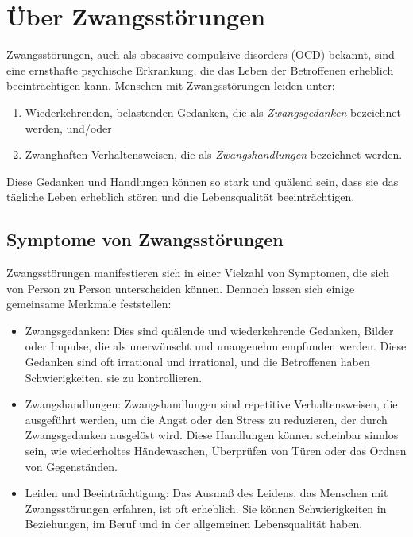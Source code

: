 \section{Über Zwangsstörungen}

Zwangsstörungen, auch als obsessive-compulsive disorders (OCD) bekannt, sind eine ernsthafte psychische Erkrankung, die das Leben der Betroffenen erheblich beeinträchtigen kann. Menschen mit Zwangsstörungen leiden unter:

\begin{enumerate}
  \item Wiederkehrenden, belastenden Gedanken, die als \textit{Zwangsgedanken} bezeichnet werden, und/oder
  \item Zwanghaften Verhaltensweisen, die als \textit{Zwangshandlungen} bezeichnet werden.
\end{enumerate}

Diese Gedanken und Handlungen können so stark und quälend sein, dass sie das tägliche Leben erheblich stören und die Lebensqualität beeinträchtigen.

\subsection{Symptome von Zwangsstörungen}

Zwangsstörungen manifestieren sich in einer Vielzahl von Symptomen, die sich von Person zu Person unterscheiden können. Dennoch lassen sich einige gemeinsame Merkmale feststellen:

\begin{itemize}
  \item Zwangsgedanken: Dies sind quälende und wiederkehrende Gedanken, Bilder oder Impulse, die als unerwünscht und unangenehm empfunden werden. Diese Gedanken sind oft irrational und irrational, und die Betroffenen haben Schwierigkeiten, sie zu kontrollieren.
  
  \item Zwangshandlungen: Zwangshandlungen sind repetitive Verhaltensweisen, die ausgeführt werden, um die Angst oder den Stress zu reduzieren, der durch Zwangsgedanken ausgelöst wird. Diese Handlungen können scheinbar sinnlos sein, wie wiederholtes Händewaschen, Überprüfen von Türen oder das Ordnen von Gegenständen.
  
  \item Leiden und Beeinträchtigung: Das Ausmaß des Leidens, das Menschen mit Zwangsstörungen erfahren, ist oft erheblich. Sie können Schwierigkeiten in Beziehungen, im Beruf und in der allgemeinen Lebensqualität haben.
\end{itemize}


